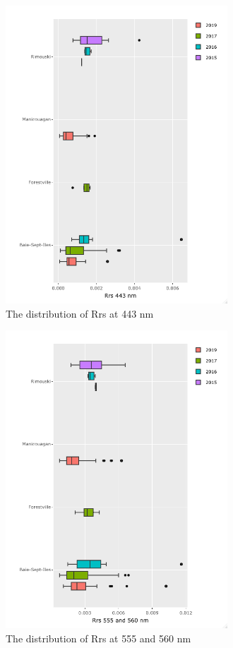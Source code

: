 \documentclass[essd, manuscript]{copernicus}
\begin{document}
\begin{figure}[t]
    \includegraphics[width=8.3cm]{Figures/fig_RRs443_boxplot.png}
    \caption{The distribution of Rrs at 443 nm }
    \label{fig:Rrs443}
\end{figure}

\begin{figure}[t]
    \includegraphics[width=8.3cm]{Figures/fig_Rrs555_boxplot.png}
    \caption{The distribution of Rrs at 555 and 560 nm }
    \label{fig:Rrs555}
\end{figure}
\end{document}
